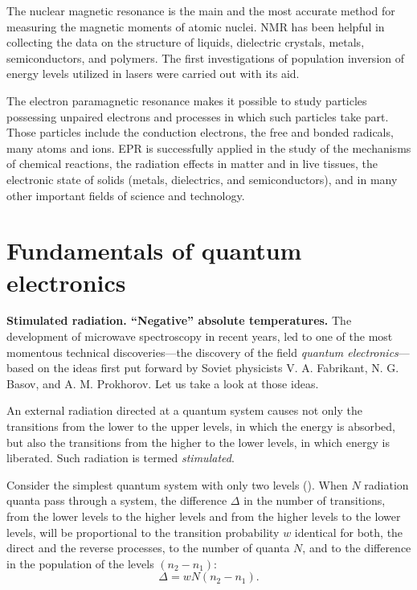 The nuclear magnetic resonance is the main and the most accurate method for measuring the magnetic moments of atomic nuclei. NMR has been helpful in collecting the data on the structure of liquids, dielectric crystals, metals, semiconductors, and polymers. The first investigations of population inversion of energy levels utilized in lasers were carried out with its aid.

The electron paramagnetic resonance makes it possible to study particles possessing unpaired electrons and processes in which such particles take part. Those particles include the conduction electrons, the free and bonded radicals, many atoms and ions. EPR is successfully applied in the study of the mechanisms of chemical reactions, the radiation effects in matter and in live tissues, the electronic state of solids (metals, dielectrics, and semiconductors), and in many other important fields of science and technology.

\section{Fundamentals of quantum electronics}\label{sec:72}

\textbf{Stimulated radiation. ``Negative'' absolute temperatures.} The development of microwave spectroscopy in recent years, led to one of the most momentous technical discoveries---the discovery of the field \textit{quantum electronics}--- based on the ideas first put forward by Soviet physicists V. A. Fabrikant, N. G. Basov, and A. M. Prokhorov. Let us take a look at those ideas.

An external radiation directed at a quantum system causes not only the transitions from the lower to the upper levels, in which the energy is absorbed, but also the transitions from the higher to the lower levels, in which energy is liberated. Such radiation is termed \textit{stimulated}.

Consider the simplest quantum system with only two levels (). When $N$ radiation quanta pass through a system, the difference $\Delta$ in the number of transitions, from the lower levels to the higher levels and from the higher levels to the lower levels, will be proportional to the transition probability $w$ identical for both, the direct and the reverse processes, to the number of quanta $N$, and to the difference in the population of the levels $(n_2-n_1)$:
\begin{equation}\label{eq:7_77}
    \Delta = w N (n_2-n_1).
\end{equation}

